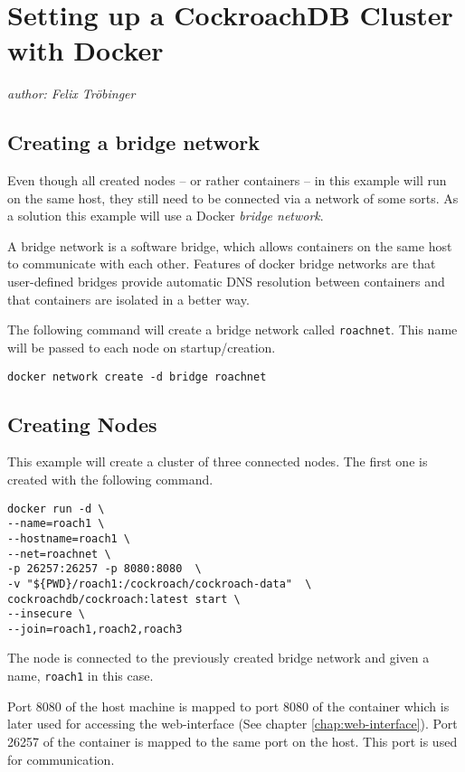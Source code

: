 \section{Setting up a CockroachDB Cluster with Docker}\label{chap:how-to}
\emph{author: Felix Tröbinger}\bigskip

\subsection{Creating a bridge network}
Even though all created nodes -- or rather containers -- in this example will run on the same host, they still need to be connected via a network of some sorts. As a solution this example will use a Docker \emph{bridge network}.

A bridge network is a software bridge, which allows containers on the same host to communicate with each other. Features of docker bridge networks are that user-defined bridges provide automatic DNS resolution between containers and that containers are isolated in a better way.\cite{docker-bridge}

\medskip
The following command will create a bridge network called \verb|roachnet|. This name will be passed to each node on startup/creation.

\begin{verbatim}
docker network create -d bridge roachnet
\end{verbatim}

\subsection{Creating Nodes}\label{chap:creating-nodes}

This example will create a cluster of three connected nodes. The first one is created with the following command.

\begin{verbatim}
docker run -d \
--name=roach1 \
--hostname=roach1 \
--net=roachnet \
-p 26257:26257 -p 8080:8080  \
-v "${PWD}/roach1:/cockroach/cockroach-data"  \
cockroachdb/cockroach:latest start \
--insecure \
--join=roach1,roach2,roach3
\end{verbatim}

The node is connected to the previously created bridge network and given a name, \verb|roach1| in this case.

\medskip
Port 8080 of the host machine is mapped to port 8080 of the container which is later used for accessing the web-interface (See chapter \ref{chap:web-interface}).
Port 26257 of the container is mapped to the same port on the host. This port is used for communication.


